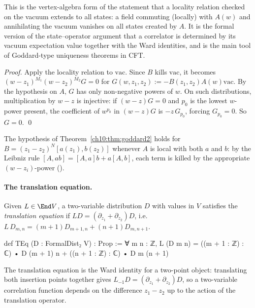 \begin{physics}
This is the vertex-algebra form of the statement that a locality relation checked on the vacuum extends to all states: a field commuting (locally) with $A(w)$ and annihilating the vacuum vanishes on all states created by $A$. It is the formal version of the state--operator argument that a correlator is determined by its vacuum expectation value together with the Ward identities, and is the main tool of Goddard-type uniqueness theorems in CFT.
\end{physics}

\emph{Proof.} Apply the locality relation to $\mathrm{vac}$.  Since $B$ kills $\mathrm{vac}$, it
becomes $(w-z_1)^{M_1}(w-z_2)^{M_2}G=0$ for $G(w,z_1,z_2):=-B(z_1,z_2)A(w)\mathrm{vac}$.  By the
hypothesis on $A$, $G$ has only non-negative powers of $w$.  On such distributions, multiplication
by $w-z$ is injective: if $(w-z)G=0$ and $p_0$ is the lowest $w$-power present, the coefficient of
$w^{p_0}$ in $(w-z)G$ is $-z\,G_{p_0}$, forcing $G_{p_0}=0$.  So $G=0$. \qed

The hypothesis of Theorem~\ref{ch10:thm:goddard2} holds for $B=(z_1-z_2)^N[a(z_1),b(z_2)]$
whenever $A$ is local with both $a$ and $b$: by the Leibniz rule
$[A,ab]=[A,a]b+a[A,b]$, each term is killed by the appropriate $(w-z_i)$-power
().

\paragraph{The translation equation.}
\begin{definition}\label{ch10:def:TEq}
Given $L\in\End V$, a two-variable distribution $D$ with values in $V$ satisfies the
\emph{translation equation} if $LD=(\partial_{z_1}+\partial_{z_2})D$, i.e.\
$L\,D_{m,n}=(m+1)D_{m+1,n}+(n+1)D_{m,n+1}$.
\end{definition}
\begin{leancode}
def TEq (D : FormalDist₂ V) : Prop :=
  ∀ m n : ℤ, L (D m n) = ((m + 1 : ℤ) : ℂ) • D (m + 1) n + ((n + 1 : ℤ) : ℂ) • D m (n + 1)
\end{leancode}

\begin{physics}
The translation equation is the Ward identity for a two-point object: translating both insertion points together gives $L_{-1}D=(\partial_{z_1}+\partial_{z_2})D$, so a two-variable correlation function depends on the difference $z_1-z_2$ up to the action of the translation operator.
\end{physics}

